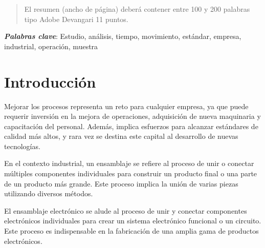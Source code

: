     \maketitle
    \thispagestyle{fancy}
    
    
    
    \begin{abstract}
    \noindent 
    El resumen (ancho de página) deberá contener entre 100 y 200 palabras tipo Adobe Devangari 11 puntos.
    
    \end{abstract}
    \textbf{\textit{Palabras clave}}: {Estudio, análisis, tiempo, movimiento, estándar, empresa, industrial, operación, muestra}
    
    
    \section{Introducción}
    
    
    Mejorar los procesos representa un reto para cualquier empresa, ya que puede requerir inversión en la mejora de operaciones, adquisición de nueva maquinaria y capacitación del personal. Además, implica esfuerzos para alcanzar estándares de calidad más altos, y rara vez se destina este capital al desarrollo de nuevas tecnologías. \cite{83520408}
    
    
    En el contexto industrial, un ensamblaje se refiere al proceso de unir o conectar múltiples componentes individuales para construir un producto final o una parte de un producto más grande. Este proceso implica la unión de varias piezas utilizando diversos métodos.
    
    
    
    El ensamblaje electrónico se alude al proceso de unir y conectar componentes electrónicos individuales para crear un sistema electrónico funcional o un circuito. Este proceso es indispensable en la fabricación de una amplia gama de productos electrónicos.
    
